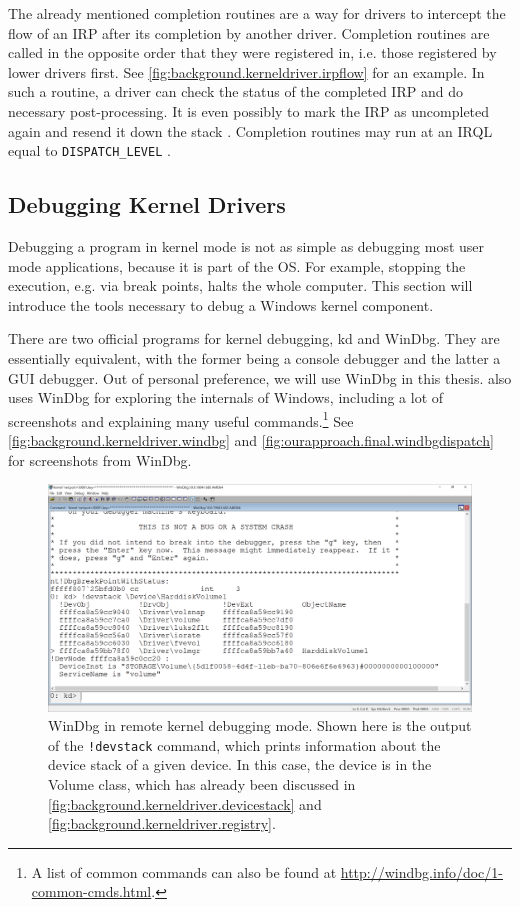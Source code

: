 The already mentioned completion routines are a way for drivers to intercept the flow of an IRP after its completion by another driver. Completion routines are called in the opposite order that they were registered in, i.e. those registered by lower drivers first. See \autoref{fig:background.kerneldriver.irpflow} for an example. In such a routine, a driver can check the status of the completed IRP and do necessary post-processing. It is even possibly to mark the IRP as uncompleted again and resend it down the stack \cite{Yosifovich2017}. Completion routines may run at an IRQL equal to \texttt{DISPATCH\_LEVEL} \cite{Wdk}.

\subsection{Debugging Kernel Drivers}
\label{chap:background.kerneldriver.debugging}
Debugging a program in kernel mode is not as simple as debugging most user mode applications, because it is part of the OS. For example, stopping the execution, e.g. via break points, halts the whole computer. This section will introduce the tools necessary to debug a Windows kernel component.

There are two official programs for kernel debugging, kd and WinDbg. They are essentially equivalent, with the former being a console debugger and the latter a GUI debugger. Out of personal preference, we will use WinDbg in this thesis. \cite{Yosifovich2017} also uses WinDbg for exploring the internals of Windows, including a lot of screenshots and explaining many useful commands.\footnote{\label{fn:background.kerneldriver.windbg} A list of common commands can also be found at \url{http://windbg.info/doc/1-common-cmds.html}.} See \autoref{fig:background.kerneldriver.windbg} and \autoref{fig:ourapproach.final.windbgdispatch} for screenshots from WinDbg.

\begin{figure}[htb!]
	\center
	\includegraphics[scale=0.117]{../img/background.kerneldriver.windbg.png}
	\caption[
		WinDbg in remote kernel debugging mode
	]{
		WinDbg in remote kernel debugging mode. Shown here is the output of the \texttt{!devstack} command, which prints information about the device stack of a given device. In this case, the device is in the Volume class, which has already been discussed in \autoref{fig:background.kerneldriver.devicestack} and \autoref{fig:background.kerneldriver.registry}.
	}
	\label{fig:background.kerneldriver.windbg}
\end{figure}

